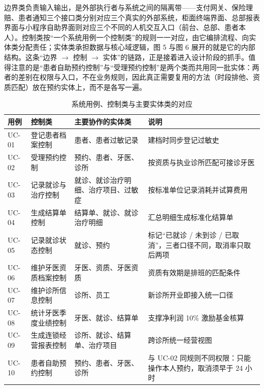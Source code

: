 \documentclass[11pt,a4paper]{ctexart}
\newcommand{\figtag}[1]{%
  \tikz[baseline=-0.35ex]{\node[fill=adcblue!90,text=white,rounded corners=1.5pt,
    inner xsep=5pt,inner ysep=1.2pt,font=\scriptsize\bfseries]{#1};}\hspace{2pt}}
\begin{document}
\figtag{图 7 说明} 边界类负责输入输出，是外部执行者与系统之间的隔离带——支付网关、保险理赔、患者通知三个接口类分别对应三个真实的外部系统，柜面终端界面、总部报表界面与小程序自助界面则对应三个不同的人机交互入口（前台、总部、患者本人）。控制类按“一个系统用例一个控制类”的规则一一对应，由它编排流程、向实体类分配责任；实体类承担数据与核心域逻辑，图 5 与图 6 展开的就是它的内部结构。这条“边界 $\rightarrow$ 控制 $\rightarrow$ 实体”的链路，正是接着进入设计阶段的抓手。值得注意的是“患者自助预约控制”与“受理预约控制”是两个类而共用同一批实体：两者的差别在权限与入口，不在业务规则，因此真正需要复用的方法（时段排他、资质匹配）放在预约实体上，而不是各写一遍。

\begin{table}[H]
\centering
\caption{系统用例、控制类与主要实体类的对应}
{\small
\begin{tabularx}{\linewidth}{@{}L{1.6cm}L{3.4cm}L{4.5cm}X@{}}
\toprule
\textbf{\textcolor{adcblue!92}{用例}} & \textbf{\textcolor{adcblue!92}{控制类}} & \textbf{\textcolor{adcblue!92}{主要协作的实体类}} & \textbf{\textcolor{adcblue!92}{说明}} \\
\midrule
UC-01 & 登记患者档案控制 & 患者、患者过敏记录 & 建档时同步登记过敏史 \\
UC-02 & 受理预约控制 & 预约、患者、牙医、诊所 & 按资质与执业诊所匹配可接诊牙医 \\
UC-03 & 记录就诊与治疗控制 & 就诊、就诊治疗明细、治疗项目、过敏症 & 按标准单位记录消耗并试算费用 \\
UC-04 & 生成结算单控制 & 结算单、就诊、就诊治疗明细 & 汇总明细生成标准化结算单 \\
UC-05 & 记录就诊状态控制 & 就诊、预约 & 标记“已就诊 / 未到诊 / 已取消”，三者口径不同，取消率只取后两项 \\
UC-06 & 维护牙医资质档案控制 & 牙医、资质、牙医资质 & 资质有效期是排班的匹配条件 \\
UC-07 & 维护诊所信息控制 & 诊所、员工 & 新诊所开业即接入统一口径 \\
UC-08 & 统计牙医季度业绩控制 & 牙医、就诊、结算单 & 支撑净利润 10\% 激励基金核算 \\
UC-09 & 生成连锁经营报表控制 & 诊所、就诊、结算单、治疗项目 & 跨诊所统一经营视图 \\
UC-10 & 患者自助预约控制 & 预约、患者、牙医、诊所 & 与 UC-02 同规则不同权限：只能操作本人预约，取消须早于 24 小时 \\
\bottomrule
\end{tabularx}
}
\end{table}
\end{document}
